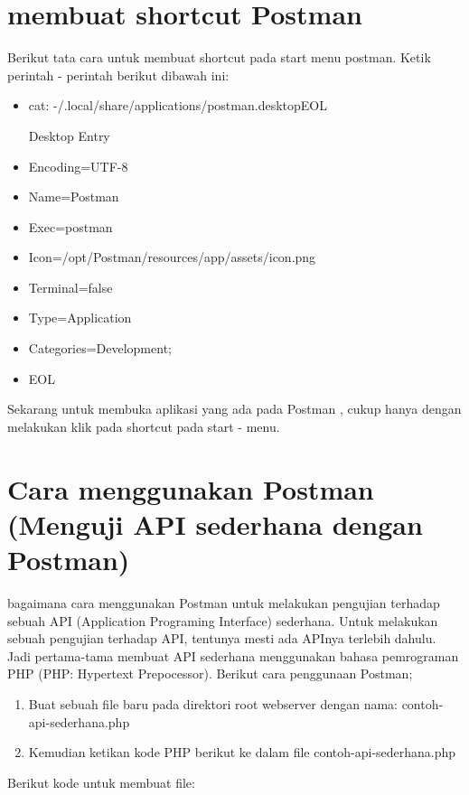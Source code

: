 \documentclass[12pt,a4paper]{article}
\begin{document}
\section{membuat shortcut Postman}
Berikut tata cara untuk membuat shortcut pada start menu postman.  Ketik perintah - perintah berikut dibawah ini:
\begin{itemize}
\item cat: -/.local/share/applications/postman.desktopEOL
\item [Desktop Entry]
\item Encoding=UTF-8
\item Name=Postman
\item Exec=postman
\item Icon=/opt/Postman/resources/app/assets/icon.png
\item Terminal=false
\item Type=Application
\item Categories=Development;
 \item EOL
\end{itemize}


Sekarang untuk membuka aplikasi yang ada pada Postman , cukup hanya dengan melakukan klik pada shortcut pada start - menu. 

\section{Cara menggunakan Postman (Menguji API sederhana dengan Postman)}
bagaimana cara menggunakan Postman untuk melakukan pengujian terhadap sebuah API (Application Programing Interface) sederhana.
Untuk melakukan sebuah pengujian terhadap API, tentunya mesti ada APInya terlebih dahulu. Jadi pertama-tama membuat API sederhana menggunakan bahasa pemrograman PHP (PHP: Hypertext Prepocessor).
Berikut cara penggunaan Postman; 
\begin{enumerate}
\item Buat sebuah file baru pada direktori root webserver dengan nama: contoh-api-sederhana.php 
\item Kemudian ketikan kode PHP berikut ke dalam file contoh-api-sederhana.php
\end{enumerate}
 Berikut kode untuk membuat file:
\end{document}
